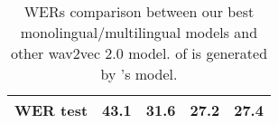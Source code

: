 \begin{table}[!ht]
\begin{adjustbox}{width=\columnwidth,center}
\begin{tabular}{|c|c|c|c|c|}
\hline
WER test          & \textcolor[rgb]{0.114,0.11,0.114}{43.1} & \textcolor[rgb]{0.114,0.11,0.114}{31.6}                        & 27.2                                                                 & 27.4                                                                    \\
\hline
\end{tabular}
\end{adjustbox}
\caption{\glspl{WER} comparison between our best monolingual/multilingual models and other wav2vec 2.0 model.  of \cite{Duy_Khanh_Finetune_Wav2vec_2_0_2022} is generated by \cite{vietai_wav2vec2_vi_2021}'s model.}
\label{literature_compare}
\end{table}